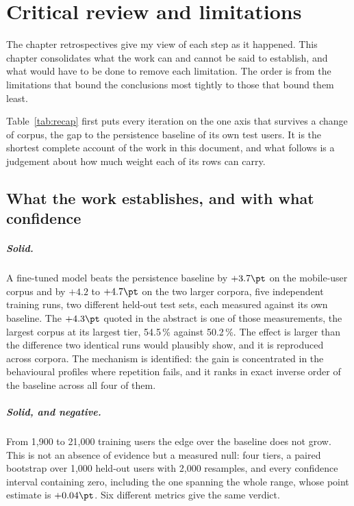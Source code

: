 \chapter{Critical review and limitations}
\label{ch:critique}

The chapter retrospectives give my view of each step as it happened. This chapter
consolidates what the work can and cannot be said to establish, and what would
have to be done to remove each limitation. The order is from the limitations that
bound the conclusions most tightly to those that bound them least.

Table~\ref{tab:recap} first puts every iteration on the one axis that survives a
change of corpus, the gap to the persistence baseline of its own test users. It
is the shortest complete account of the work in this document, and what follows
is a judgement about how much weight each of its rows can carry.



\section{What the work establishes, and with what confidence}

\paragraph{Solid.} A fine-tuned model beats the persistence baseline by
$+3.7\pt$ on the mobile-user corpus and by $+4.2$ to $+4.7\pt$ on the two larger
corpora, five independent training runs, two different held-out test sets,
each measured against its own baseline. The $+4.3\pt$ quoted in the abstract is
one of those measurements, the largest corpus at its largest tier, 54.5\,\%
against 50.2\,\%. The effect is larger than the difference two identical runs
would plausibly show, and it is reproduced across corpora. The mechanism is identified: the
gain is concentrated in the behavioural profiles where repetition fails, and it
ranks in exact inverse order of the baseline across all four of them.

\paragraph{Solid, and negative.} From 1{,}900 to 21{,}000 training users
the edge over the baseline does not grow. This is not an absence of evidence but
a measured null: four tiers, a paired bootstrap over 1{,}000 held-out users with
2{,}000 resamples, and every confidence interval containing zero, including
the one spanning the whole range, whose point estimate is $+0.04\pt$. Six
different metrics give the same verdict.

